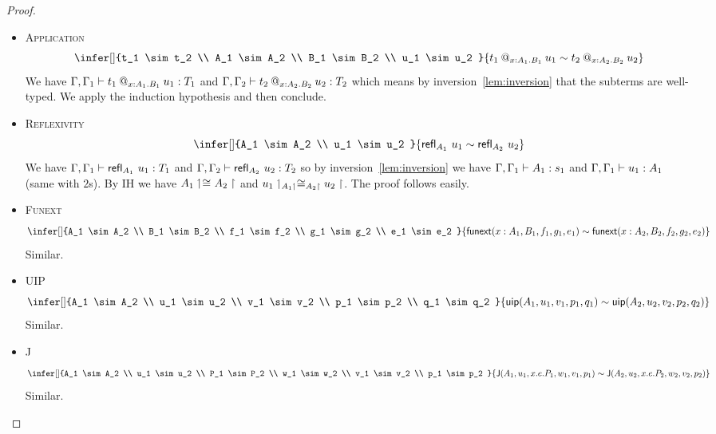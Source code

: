 \begin{proof}
\begin{itemize}
    \item \textsc{Application}
    \[
      \infer[]
        {t_1 \sim t_2 \\
         A_1 \sim A_2 \\
         B_1 \sim B_2 \\
         u_1 \sim u_2
        }
        {\app{t_1}{x:A_1}{B_1}{u_1} \sim \app{t_2}{x:A_2}{B_2}{u_2}}
    \]
    We have $\isterm{\Ga, \Ga_1}{\app{t_1}{x:A_1}{B_1}{u_1}}{T_1}$ and
    $\isterm{\Ga, \Ga_2}{\app{t_2}{x:A_2}{B_2}{u_2}}{T_2}$ which means by
    inversion~\eqref{lem:inversion} that the subterms are well-typed.
    We apply the induction hypothesis and then conclude.

    \item \textsc{Reflexivity}
    \[
      \infer[]
        {A_1 \sim A_2 \\
         u_1 \sim u_2
        }
        {\refl{A_1} u_1 \sim \refl{A_2} u_2}
    \]
    We have $\isterm{\Ga, \Ga_1}{\refl{A_1} u_1}{T_1}$ and
    $\isterm{\Ga, \Ga_2}{\refl{A_2} u_2}{T_2}$ so by
    inversion~\eqref{lem:inversion} we have $\isterm{\Ga, \Ga_1}{A_1}{s_1}$ and
    $\isterm{\Ga, \Ga_1}{u_1}{A_1}$
    (same with $2$s). By IH we have $\Heq{}{\lo{A_1}}{}{\ro{A_2}}$ and
    $\Heq{\lo{A_1}}{\lo{u_1}}{\ro{A_2}}{\ro{u_2}}$.
    The proof follows easily.

    \item \textsc{Funext}
    \[
      \infer[]
        {A_1 \sim A_2 \\
         B_1 \sim B_2 \\
         f_1 \sim f_2 \\
         g_1 \sim g_2 \\
         e_1 \sim e_2
        }
        {\funext{x:A_1}{B_1}{f_1}{g_1}{e_1}
         \sim \funext{x:A_2}{B_2}{f_2}{g_2}{e_2}
        }
    \]
    Similar.

    \item \textsc{UIP}
    \[
      \infer[]
        {A_1 \sim A_2 \\
         u_1 \sim u_2 \\
         v_1 \sim v_2 \\
         p_1 \sim p_2 \\
         q_1 \sim q_2
        }
        {\uip{A_1}{u_1}{v_1}{p_1}{q_1} \sim \uip{A_2}{u_2}{v_2}{p_2}{q_2}}
    \]
    Similar.

    \item \textsc{J}
    \[
      \infer[]
        {A_1 \sim A_2 \\
         u_1 \sim u_2 \\
         P_1 \sim P_2 \\
         w_1 \sim w_2 \\
         v_1 \sim v_2 \\
         p_1 \sim p_2
        }
        {\J{A_1}{u_1}{x.e.P_1}{w_1}{v_1}{p_1} \sim
         \J{A_2}{u_2}{x.e.P_2}{w_2}{v_2}{p_2}
        }
    \]
    Similar.
  \end{itemize}
\end{proof}

